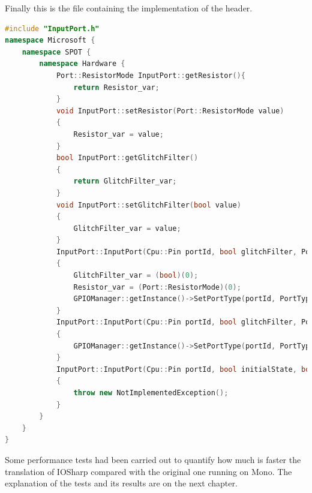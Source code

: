 Finally this is the file containing the implementation of the header.
\begin{lstlisting}[language=C++, caption={Implementation of the InterruptPort in C++}]
#include "InputPort.h"
namespace Microsoft {
	namespace SPOT {
		namespace Hardware {
			Port::ResistorMode InputPort::getResistor(){
				return Resistor_var;
			}
			void InputPort::setResistor(Port::ResistorMode value)
			{
				Resistor_var = value;
			}
			bool InputPort::getGlitchFilter()
			{
				return GlitchFilter_var;
			}
			void InputPort::setGlitchFilter(bool value)
			{
				GlitchFilter_var = value;
			}
			InputPort::InputPort(Cpu::Pin portId, bool glitchFilter, Port::ResistorMode resistor) : Port(portId, glitchFilter, resistor, Port::InterruptMode::InterruptNone)
			{
				GlitchFilter_var = (bool)(0);
				Resistor_var = (Port::ResistorMode)(0);
				GPIOManager::getInstance()->SetPortType(portId, PortType::INPUT);
			}
			InputPort::InputPort(Cpu::Pin portId, bool glitchFilter, Port::ResistorMode resistor, Port::InterruptMode interruptMode) : Port(portId, glitchFilter, resistor, interruptMode)
			{
				GPIOManager::getInstance()->SetPortType(portId, PortType::INPUT);
			}
			InputPort::InputPort(Cpu::Pin portId, bool initialState, bool glitchFilter, Port::ResistorMode resistor) : Port(portId, initialState, glitchFilter, resistor)
			{
				throw new NotImplementedException();
			}
		}
	}
}
\end{lstlisting}

Some performance tests had been carried out to quantify how much is faster the translation of IOSharp compared with the original one running on Mono. The explanation of the tests and its results are on the next chapter.